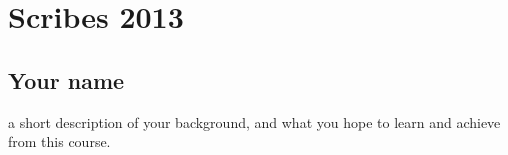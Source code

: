\chapter*{Scribes 2013}

\section{Your name}

a short description of your background, and what you hope to learn and
achieve from this course.




